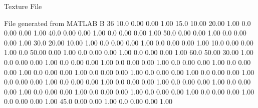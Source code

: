 Texture File

File generated from MATLAB
B 36
   10.0   0.00   0.00  1.00
   15.0   10.00   20.00  1.00
   0.0   0.00   0.00  1.00
   40.0   0.00   0.00  1.00
   0.0   0.00   0.00  1.00
   50.0   0.00   0.00  1.00
   0.0   0.00   0.00  1.00
   30.0   20.00   10.00  1.00
   0.0   0.00   0.00  1.00
   0.0   0.00   0.00  1.00
   10.0   0.00   0.00  1.00
   0.0   50.00   0.00  1.00
   0.0   0.00   0.00  1.00
   0.0   0.00   0.00  1.00
   60.0   50.00   30.00  1.00
   0.0   0.00   0.00  1.00
   0.0   0.00   0.00  1.00
   0.0   0.00   0.00  1.00
   0.0   0.00   0.00  1.00
   0.0   0.00   0.00  1.00
   0.0   0.00   0.00  1.00
   0.0   0.00   0.00  1.00
   0.0   0.00   0.00  1.00
   0.0   0.00   0.00  1.00
   0.0   0.00   0.00  1.00
   0.0   0.00   0.00  1.00
   0.0   0.00   0.00  1.00
   0.0   0.00   0.00  1.00
   0.0   0.00   0.00  1.00
   0.0   0.00   0.00  1.00
   0.0   0.00   0.00  1.00
   0.0   0.00   0.00  1.00
   0.0   0.00   0.00  1.00
   0.0   0.00   0.00  1.00
  45.0   0.00   0.00  1.00
   0.0   0.00   0.00  1.00
